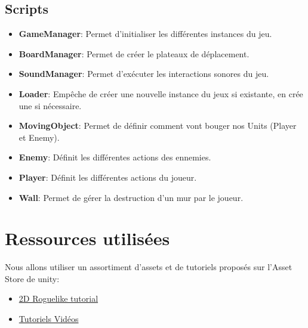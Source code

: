 \documentclass[onecolumn, 12pt]{article}
\begin{document}
\subsection{Scripts}\label{scripts}

\begin{itemize}

\item
  \textbf{GameManager}: Permet d'initialiser les différentes instances
  du jeu.
\item
  \textbf{BoardManager}: Permet de créer le plateaux de déplacement.
\item
  \textbf{SoundManager}: Permet d'exécuter les interactions sonores du
  jeu.
\item
  \textbf{Loader}: Empêche de créer une nouvelle instance du jeux si existante, en crée une si nécessaire.
\item
  \textbf{MovingObject}: Permet de définir comment vont bouger nos Units
  (Player et Enemy).
\item
  \textbf{Enemy}: Définit les différentes actions des ennemies.
\item
  \textbf{Player}: Définit les différentes actions du joueur.
\item
  \textbf{Wall}: Permet de gérer la destruction d'un mur par le joueur.
\end{itemize}

\section{Ressources utilisées}\label{ressources-utilisuxe9s}

Nous allons utiliser un assortiment d'assets et de tutoriels proposés
sur l'Asset Store de unity:

\begin{itemize}

\item
  \href{https://unity3d.com/fr/learn/tutorials/s/2d-roguelike-tutorial}{2D
  Roguelike tutorial}
\item
  \href{https://www.youtube.com/watch?v=Fdcnt2-Jf4w\&list=PLX2vGYjWbI0SKsNH5Rkpxvxr1dPE0Lw8F}{Tutoriels
  Vidéos}
\end{itemize}
\end{document}
